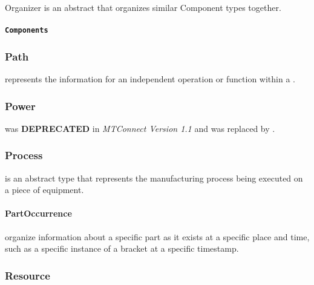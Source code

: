 {{Organizer}} is an abstract  that \glspl{organize} similar {{Component}} types together.


\paragraph{\texttt{Components}}\mbox{}
\label{sec:Components}

\newline 

\subsubsection{Path}
\label{sec:Path}



 represents the information for an independent operation or function within a .


\subsubsection{Power}
\label{sec:Power}



 was \textbf{DEPRECATED} in \textit{MTConnect Version 1.1} and was replaced by .


\subsubsection{Process}
\label{sec:Process}



 is an abstract  type that represents the manufacturing process being executed on a piece of equipment.



\paragraph{PartOccurrence}\mbox{}
\label{sec:PartOccurrence}


 \gls{organize} information about a specific part as it exists at a specific place and time, such as a specific instance of a bracket at a specific timestamp.


\subsubsection{Resource}
\label{sec:Resource}




